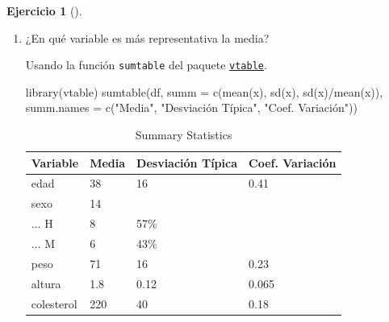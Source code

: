 \documentclass[
  a4paper,
]{scrreport}
\newenvironment{Shaded}{\begin{snugshade}}{\end{snugshade}}
\newcommand{\AttributeTok}[1]{\textcolor[rgb]{0.40,0.45,0.13}{#1}}
\newcommand{\FunctionTok}[1]{\textcolor[rgb]{0.28,0.35,0.67}{#1}}
\newcommand{\NormalTok}[1]{\textcolor[rgb]{0.00,0.23,0.31}{#1}}
\newcommand{\StringTok}[1]{\textcolor[rgb]{0.13,0.47,0.30}{#1}}
\theoremstyle{definition}
\newtheorem{exercise}{Ejercicio}[chapter]
\theoremstyle{remark}
\begin{document}
\begin{exercise}[]
\begin{enumerate}
\begin{tcolorbox}
  \end{tcolorbox}
\item
  ¿En qué variable es más representativa la media?

  \begin{tcolorbox}[enhanced jigsaw, coltitle=black, left=2mm, colback=white, leftrule=.75mm, toptitle=1mm, breakable, bottomrule=.15mm, titlerule=0mm, bottomtitle=1mm, title=\textcolor{quarto-callout-tip-color}{\faLightbulb}\hspace{0.5em}{Solución 1}, arc=.35mm, toprule=.15mm, rightrule=.15mm, colframe=quarto-callout-tip-color-frame, opacityback=0, colbacktitle=quarto-callout-tip-color!10!white, opacitybacktitle=0.6]

  Usando la función \texttt{sumtable} del paquete
  \href{https://cran.r-project.org/web/packages/vtable/vignettes/sumtable.html}{\texttt{vtable}}.

\begin{Shaded}
\begin{Highlighting}[]
\FunctionTok{library}\NormalTok{(vtable)}
\FunctionTok{sumtable}\NormalTok{(df, }\AttributeTok{summ =} \FunctionTok{c}\NormalTok{(}\StringTok{\textquotesingle{}mean(x)\textquotesingle{}}\NormalTok{, }\StringTok{\textquotesingle{}sd(x)\textquotesingle{}}\NormalTok{, }\StringTok{\textquotesingle{}sd(x)/mean(x)\textquotesingle{}}\NormalTok{),}
\AttributeTok{summ.names =} \FunctionTok{c}\NormalTok{(}\StringTok{"Media"}\NormalTok{, }\StringTok{"Desviación Típica"}\NormalTok{, }\StringTok{"Coef. Variación"}\NormalTok{))}
\end{Highlighting}
\end{Shaded}

  \begin{table}

  \caption{Summary Statistics}
  \centering
  \begin{tabular}[t]{llll}
  \toprule
  Variable & Media & Desviación Típica & Coef. Variación\\
  \midrule
  edad & 38 & 16 & 0.41\\
  sexo & 14 &  & \\
  ... H & 8 & 57\% & \\
  ... M & 6 & 43\% & \\
  peso & 71 & 16 & 0.23\\
  \addlinespace
  altura & 1.8 & 0.12 & 0.065\\
  colesterol & 220 & 40 & 0.18\\
  \bottomrule
  \end{tabular}
  \end{table}


\end{tcolorbox}
\end{enumerate}
\end{exercise}
\end{document}
